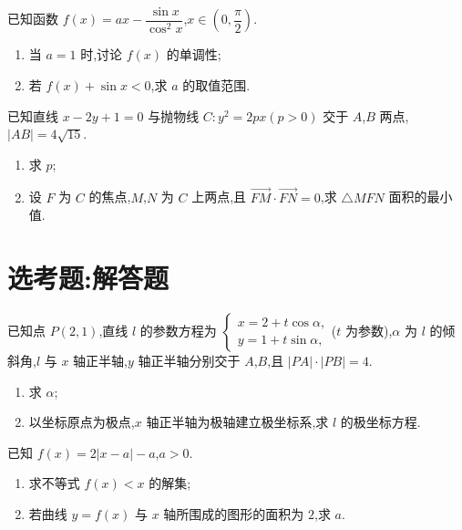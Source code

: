 \begin{problem}
已知函数 \(f(x)=ax-\dfrac{\sin x}{\cos^2x}\),\(x\in\left(0,\dfrac{\pi}{2}\right)\).
\begin{enumerate}
\item 当 \(a=1\) 时,讨论 \(f(x)\) 的单调性;
\item 若 \(f(x)+\sin x<0\),求 \(a\) 的取值范围.
\end{enumerate}
\end{problem}

\begin{problem}
已知直线 \(x-2y+1=0\) 与抛物线 \(C:y^2=2px\left(p>0\right)\) 交于 \(A\),\(B\) 两点,\(|AB|=4\sqrt{15}\).
\begin{enumerate}
\item 求 \(p\);
\item 设 \(F\) 为 \(C\) 的焦点,\(M\),\(N\) 为 \(C\) 上两点,且 \(\overrightarrow{FM}\cdot\overrightarrow{FN}=0\),求 \(\triangle MFN\) 面积的最小值.
\end{enumerate}
\end{problem}

\section{选考题:解答题}

\begin{problem}
已知点 \(P(2,1)\),直线 \(l\) 的参数方程为
\(\begin{cases}
x=2+t\cos\alpha,\\
y=1+t\sin\alpha,
\end{cases}\)(\(t\) 为参数),\(\alpha\) 为 \(l\) 的倾斜角,\(l\) 与 \(x\) 轴正半轴,\(y\) 轴正半轴分别交于 \(A\),\(B\),且 \(|PA|\cdot|PB|=4\).
\begin{enumerate}
\item 求 \(\alpha\);
\item 以坐标原点为极点,\(x\) 轴正半轴为极轴建立极坐标系,求 \(l\) 的极坐标方程.
\end{enumerate}
\end{problem}

\begin{problem}
已知 \(f(x)=2|x-a|-a\),\(a>0\).
\begin{enumerate}
\item 求不等式 \(f(x)<x\) 的解集;
\item 若曲线 \(y=f(x)\) 与 \(x\) 轴所围成的图形的面积为 \(2\),求 \(a\).
\end{enumerate}
\end{problem}

